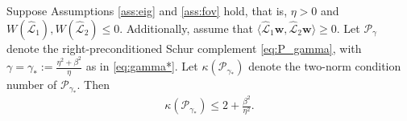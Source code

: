 \documentclass[review]{siamart}
\begin{document}
%
\begin{theorem}\label{th:cond}
Suppose Assumptions \ref{ass:eig} and \ref{ass:fov} hold, that is, $\eta > 0$
and $W(\widehat{\mathcal{L}}_1),W(\widehat{\mathcal{L}}_2) \leq 0$.
Additionally, assume that $\langle\widehat{\mathcal{L}}_1\mathbf{w},
\widehat{\mathcal{L}}_2\mathbf{w}\rangle\geq 0$. Let $\mathcal{P}_\gamma$
denote the right-preconditioned Schur complement \eqref{eq:P_gamma}, with
$\gamma = \gamma_* := \tfrac{\eta^2+\beta^2}{\eta}$ as in \eqref{eq:gamma*}.
Let $\kappa(\mathcal{P}_{\gamma_*})$ denote the two-norm condition number of
$\mathcal{P}_{\gamma_*}$. Then
\begin{align}\label{eq:gammastar_cond}
\kappa(\mathcal{P}_{\gamma_*}) \leq
	2 + \frac{\beta^2}{\eta^2}.
\end{align}
\end{theorem}
\end{document}
